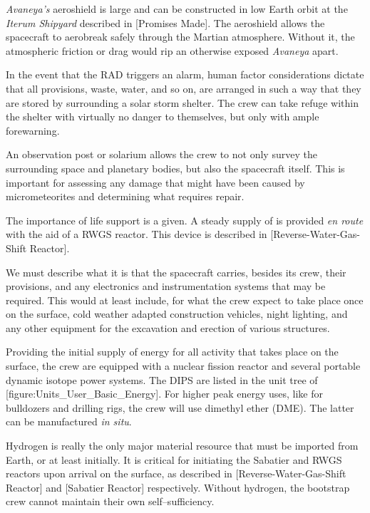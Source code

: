 
{\it Avaneya's} aeroshield is large and can be constructed in low Earth orbit at the {\it Iterum Shipyard} described in [Promises Made]. The aeroshield allows the spacecraft to aerobreak safely through the Martian atmosphere. Without it, the atmospheric friction or drag would rip an otherwise exposed {\it Avaneya} apart.

In the event that the RAD triggers an alarm, human factor considerations dictate that all provisions, waste, water, and so on, are arranged in such a way that they are stored by surrounding a solar storm shelter. The crew can take refuge within the shelter with virtually no danger to themselves, but only with ample forewarning.

An observation post or solarium allows the crew to not only survey the surrounding space and planetary bodies, but also the spacecraft itself. This is important for assessing any damage that might have been caused by micrometeorites and determining what requires repair.

The importance of life support is a given. A steady supply of  is provided {\it en route} with the aid of a RWGS reactor. This device is described in [Reverse-Water-Gas-Shift Reactor].

We must describe what it is that the spacecraft carries, besides its crew, their provisions, and any electronics and instrumentation systems that may be required. This would at least include, for what the crew expect to take place once on the surface, cold weather adapted construction vehicles, night lighting, and any other equipment for the excavation and erection of various structures. 

Providing the initial supply of energy for all activity that takes place on the surface, the crew are equipped with a nuclear fission reactor and several portable dynamic isotope power systems. The DIPS are listed in the unit tree of [figure:Units_User_Basic_Energy]. For higher peak energy uses, like for bulldozers and drilling rigs, the crew will use dimethyl ether  (DME). The latter can be manufactured {\it in situ}.

Hydrogen is really the only major material resource that must be imported from Earth, or at least initially.  It is critical for initiating the Sabatier and RWGS reactors upon arrival on the surface, as described in [Reverse-Water-Gas-Shift Reactor] and [Sabatier Reactor] respectively. Without hydrogen, the bootstrap crew cannot maintain their own self--sufficiency. 

